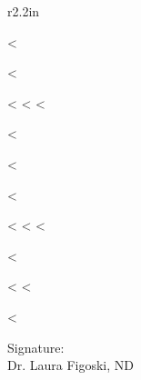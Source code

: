 \documentclass{NDChart}
\begin{document}
\begin{wrapfigure}{r}{2.2in}

  \begin{sidebox}[frametitle={Problem List}]
    <%
    \begin{boxitemize}
      \raggedright
      <%
        \item <%
              <%
      <%
    \end{boxitemize}
    <%
  \end{sidebox}

  \vspace*{11pt}

  \begin{sidebox}[frametitle={Currently Taking}]
    <%
    \begin{boxitemize}
      \raggedright
      <%
        \item <%
              <%
      <%
    \end{boxitemize}
    <%
  \end{sidebox}

  \vspace{-2em}

\end{wrapfigure}

\nullspace

<%
<%

<%

\vfill
\nopagebreak[4]
\begin{flushright}
Signature: \underline{\hspace{2.5in}}\\
Dr. Laura Figoski, ND
\end{flushright}
\end{document}
